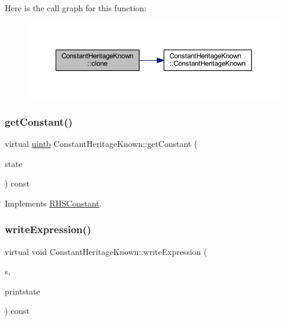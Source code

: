 Here is the call graph for this function\+:
\nopagebreak
\begin{figure}[H]
\begin{center}
\leavevmode
\includegraphics[width=350pt]{class_constant_heritage_known_a07568a5e04c406e0a08fe2f07f15ccc1_cgraph}
\end{center}
\end{figure}
\mbox{\label{class_constant_heritage_known_a700e11fdfe28144dff4f55f05620f7b4}} 
\subsubsection{\texorpdfstring{getConstant()}{getConstant()}}
{\footnotesize\ttfamily virtual \mbox{\hyperlink{types_8h_a2db313c5d32a12b01d26ac9b3bca178f}{uintb}} Constant\+Heritage\+Known\+::get\+Constant (\begin{DoxyParamCaption}\item[{\mbox{\hyperlink{class_unify_state}{Unify\+State}} \&}]{state }\end{DoxyParamCaption}) const\hspace{0.3cm}{\ttfamily [virtual]}}



Implements \mbox{\hyperlink{class_r_h_s_constant_a941b5d2898cbce985a3ef9c5db6fa458}{R\+H\+S\+Constant}}.

\mbox{\label{class_constant_heritage_known_a52ea0bf86bff79609c576a29a523660a}} 
\subsubsection{\texorpdfstring{writeExpression()}{writeExpression()}}
{\footnotesize\ttfamily virtual void Constant\+Heritage\+Known\+::write\+Expression (\begin{DoxyParamCaption}\item[{ostream \&}]{s,  }\item[{\mbox{\hyperlink{class_unify_c_printer}{Unify\+C\+Printer}} \&}]{printstate }\end{DoxyParamCaption}) const\hspace{0.3cm}{\ttfamily [virtual]}}



